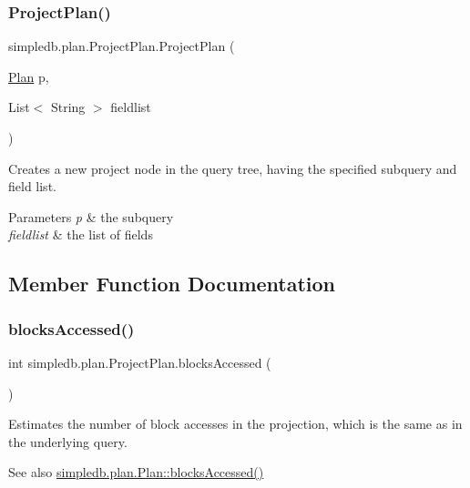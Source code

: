 \subsubsection{\texorpdfstring{Project\+Plan()}{ProjectPlan()}}
{\footnotesize\ttfamily simpledb.\+plan.\+Project\+Plan.\+Project\+Plan (\begin{DoxyParamCaption}\item[{\hyperlink{interfacesimpledb_1_1plan_1_1Plan}{Plan}}]{p,  }\item[{List$<$ String $>$}]{fieldlist }\end{DoxyParamCaption})\hspace{0.3cm}{\ttfamily [inline]}}

Creates a new project node in the query tree, having the specified subquery and field list. 
\begin{DoxyParams}{Parameters}
{\em p} & the subquery \\
\hline
{\em fieldlist} & the list of fields \\
\hline
\end{DoxyParams}


\subsection{Member Function Documentation}
\mbox{\label{classsimpledb_1_1plan_1_1ProjectPlan_a179e4f2151d40cef19af2117bb790112}} 
\subsubsection{\texorpdfstring{blocks\+Accessed()}{blocksAccessed()}}
{\footnotesize\ttfamily int simpledb.\+plan.\+Project\+Plan.\+blocks\+Accessed (\begin{DoxyParamCaption}{ }\end{DoxyParamCaption})\hspace{0.3cm}{\ttfamily [inline]}}

Estimates the number of block accesses in the projection, which is the same as in the underlying query. \begin{DoxySeeAlso}{See also}
\hyperlink{interfacesimpledb_1_1plan_1_1Plan_a6a333b95b956fe224812155b9d1c8202}{simpledb.\+plan.\+Plan\+::blocks\+Accessed()} 
\end{DoxySeeAlso}


